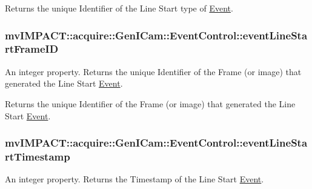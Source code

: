 Returns the unique Identifier of the Line Start type of \hyperlink{classmv_i_m_p_a_c_t_1_1acquire_1_1_event}{Event}. \hypertarget{classmv_i_m_p_a_c_t_1_1acquire_1_1_gen_i_cam_1_1_event_control_a4362398097db9c150ffc80d189675ca1}{
\subsubsection[{event\+Line\+Start\+Frame\+I\+D}]{ mv\+I\+M\+P\+A\+C\+T\+::acquire\+::\+Gen\+I\+Cam\+::\+Event\+Control\+::event\+Line\+Start\+Frame\+I\+D}}\label{classmv_i_m_p_a_c_t_1_1acquire_1_1_gen_i_cam_1_1_event_control_a4362398097db9c150ffc80d189675ca1}


An integer property. Returns the unique Identifier of the Frame (or image) that generated the Line Start \hyperlink{classmv_i_m_p_a_c_t_1_1acquire_1_1_event}{Event}. 

Returns the unique Identifier of the Frame (or image) that generated the Line Start \hyperlink{classmv_i_m_p_a_c_t_1_1acquire_1_1_event}{Event}. \hypertarget{classmv_i_m_p_a_c_t_1_1acquire_1_1_gen_i_cam_1_1_event_control_a24b40434f62e07299e34d3cab39d8ea5}{
\subsubsection[{event\+Line\+Start\+Timestamp}]{ mv\+I\+M\+P\+A\+C\+T\+::acquire\+::\+Gen\+I\+Cam\+::\+Event\+Control\+::event\+Line\+Start\+Timestamp}}\label{classmv_i_m_p_a_c_t_1_1acquire_1_1_gen_i_cam_1_1_event_control_a24b40434f62e07299e34d3cab39d8ea5}


An integer property. Returns the Timestamp of the Line Start \hyperlink{classmv_i_m_p_a_c_t_1_1acquire_1_1_event}{Event}. 

